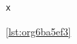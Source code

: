 \documentclass[11pt]{article}
\author{root}
\date{\today}
\title{}
\begin{document}
\tableofcontents

\begin{verbatim}
x
\end{verbatim}
\ref{lst:org6ba5ef3}
\end{document}
